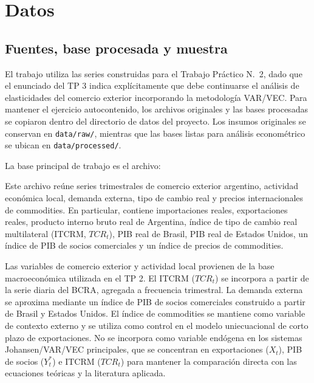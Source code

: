 \documentclass[11pt,a4paper]{article}
\begin{document}
	\section{Datos}
	\label{sec:datos}
	
	\subsection{Fuentes, base procesada y muestra}
	\label{subsec:datos-fuentes-muestra}
	
	El trabajo utiliza las series construidas para el Trabajo Práctico
	N.\textdegree~2, dado que el enunciado del TP 3 indica explícitamente que debe
	continuarse el análisis de elasticidades del comercio exterior incorporando la
	metodología VAR/VEC. Para mantener el ejercicio autocontenido, los archivos
	originales y las bases procesadas se copiaron dentro del directorio de datos
	del proyecto. Los insumos originales se conservan en \texttt{data/raw/},
	mientras que las bases listas para análisis econométrico
	se ubican en \texttt{data/processed/}.
	
	La base principal de trabajo es el archivo:
	\begin{center}
		\small{}
	\end{center}
	Este archivo reúne series trimestrales de comercio exterior argentino, actividad
	económica local, demanda externa, tipo de cambio real y precios internacionales
	de commodities. En particular, contiene importaciones reales, exportaciones
	reales, producto interno bruto real de Argentina, índice de tipo de cambio real
	multilateral (ITCRM, \(TCR_t\)), PIB real de Brasil, PIB real de Estados Unidos, un índice
	de PIB de socios comerciales y un índice de precios de commodities.
	
	Las variables de comercio exterior y actividad local provienen de la base
	macroeconómica utilizada en el TP 2. El ITCRM (\(TCR_t\)) se incorpora a partir de la serie
	diaria del BCRA, agregada a frecuencia trimestral. La demanda externa se aproxima
	mediante un índice de PIB de socios comerciales construido a partir de Brasil y
	Estados Unidos. El índice de commodities se mantiene como variable de contexto
	externo y se utiliza como control en el modelo uniecuacional de corto plazo de
	exportaciones. No se incorpora como variable endógena en los sistemas
	Johansen/VAR/VEC principales, que se concentran en exportaciones (\(X_t\)), PIB
	de socios (\(Y_t^*\)) e ITCRM (\(TCR_t\)) para mantener la comparación directa
	con las ecuaciones teóricas y la literatura aplicada.
	
\end{document}
